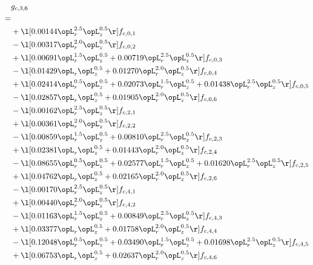 \begin{alignat}{2} 
\label{eq:g_36_0} 
& g_{c,3,6} \nonumber \\ 
 = \\ 
& + \l[  0.00144 \opL_r^{2.5} \opL_z^{0.5}  \r] f_{c,0,1} \nonumber \\ 
& - \l[  0.00317 \opL_r^{2.0} \opL_z^{0.5}  \r] f_{c,0,2} \nonumber \\ 
& + \l[  0.00691 \opL_r^{1.5} \opL_z^{0.5} +  0.00719 \opL_r^{2.5} \opL_z^{0.5}  \r] f_{c,0,3} \nonumber \\ 
& - \l[  0.01429 \opL_r \opL_z^{0.5} +  0.01270 \opL_r^{2.0} \opL_z^{0.5}  \r] f_{c,0,4} \nonumber \\ 
& + \l[  0.02414 \opL_r^{0.5} \opL_z^{0.5} +  0.02073 \opL_r^{1.5} \opL_z^{0.5} +  0.01438 \opL_r^{2.5} \opL_z^{0.5}  \r] f_{c,0,5} \nonumber \\ 
& - \l[  0.02857 \opL_r \opL_z^{0.5} +  0.01905 \opL_r^{2.0} \opL_z^{0.5}  \r] f_{c,0,6} \nonumber \\ 
& - \l[  0.00162 \opL_r^{2.5} \opL_z^{0.5}  \r] f_{c,2,1} \nonumber \\ 
& + \l[  0.00361 \opL_r^{2.0} \opL_z^{0.5}  \r] f_{c,2,2} \nonumber \\ 
& - \l[  0.00859 \opL_r^{1.5} \opL_z^{0.5} +  0.00810 \opL_r^{2.5} \opL_z^{0.5}  \r] f_{c,2,3} \nonumber \\ 
& + \l[  0.02381 \opL_r \opL_z^{0.5} +  0.01443 \opL_r^{2.0} \opL_z^{0.5}  \r] f_{c,2,4} \nonumber \\ 
& - \l[  0.08655 \opL_r^{0.5} \opL_z^{0.5} +  0.02577 \opL_r^{1.5} \opL_z^{0.5} +  0.01620 \opL_r^{2.5} \opL_z^{0.5}  \r] f_{c,2,5} \nonumber \\ 
& + \l[  0.04762 \opL_r \opL_z^{0.5} +  0.02165 \opL_r^{2.0} \opL_z^{0.5}  \r] f_{c,2,6} \nonumber \\ 
& - \l[  0.00170 \opL_r^{2.5} \opL_z^{0.5}  \r] f_{c,4,1} \nonumber \\ 
& + \l[  0.00440 \opL_r^{2.0} \opL_z^{0.5}  \r] f_{c,4,2} \nonumber \\ 
& - \l[  0.01163 \opL_r^{1.5} \opL_z^{0.5} +  0.00849 \opL_r^{2.5} \opL_z^{0.5}  \r] f_{c,4,3} \nonumber \\ 
& + \l[  0.03377 \opL_r \opL_z^{0.5} +  0.01758 \opL_r^{2.0} \opL_z^{0.5}  \r] f_{c,4,4} \nonumber \\ 
& - \l[  0.12048 \opL_r^{0.5} \opL_z^{0.5} +  0.03490 \opL_r^{1.5} \opL_z^{0.5} +  0.01698 \opL_r^{2.5} \opL_z^{0.5}  \r] f_{c,4,5} \nonumber \\ 
& + \l[  0.06753 \opL_r \opL_z^{0.5} +  0.02637 \opL_r^{2.0} \opL_z^{0.5}  \r] f_{c,4,6} \nonumber \\ 

\end{alignat}
